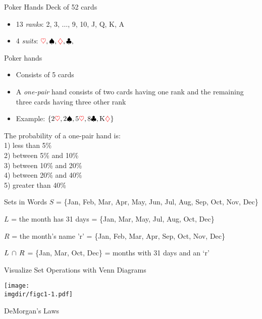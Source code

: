 \begin{frame}{Poker Hands}
Deck of 52 cards
\begin{itemize}
\item 13 \emph{ranks}: 2, 3, $\dots$, 9, 10, J, Q, K, A
\item  4 \emph{suits}: ${\color{red} \heartsuit},  \spadesuit, {\color{red} \diamondsuit}, \clubsuit,$
\end{itemize}

Poker hands
\begin{itemize}
\item Consists of 5 cards
\item A {\em one-pair} hand consists of two cards having one rank and the remaining three cards having three other rank
\item Example: $\{2 {\color{red} \heartsuit}, 2 \spadesuit, 5 {\color{red} \heartsuit}, 8 \clubsuit, \text{K} {\color{red} \diamondsuit}\}$ 

\end{itemize}


The probability of a one-pair hand is: \\
1) less than 5\%\\
2) between 5\% and 10\% \\
3) between 10\% and 20\%\\
4) between 20\% and 40\% \\
5) greater than 40\% \\
\end{frame}

\begin{frame}{Sets in Words}
$S$ = \{Jan, Feb, Mar, Apr, May, Jun, Jul, Aug, Sep, Oct, Nov, Dec\}
\bigskip

$L$ = the month has 31 days = \{Jan, Mar, May, Jul, Aug, Oct, Dec\}
\bigskip

$R$ = the month's name 'r' = \{Jan, Feb, Mar, Apr, Sep, Oct, Nov, Dec\}
\bigskip

$L\,\cap\, R$ = \{Jan, Mar, Oct, Dec\} = months with 31 days and an `r'
\end{frame}

\begin{frame}{Visualize Set Operations with Venn Diagrams}


\texttt{[image: \\imgdir/figc1-1.pdf]}
\end{frame}

\begin{frame}{DeMorgan's Laws}

{\LARGE
{}

\bigskip

}
\end{frame}

